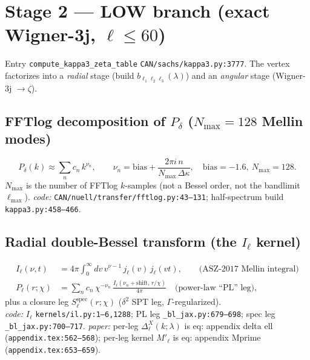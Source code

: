 \documentclass[11pt]{article}
\newcommand{\code}[1]{\texttt{\footnotesize #1}}
\newcommand{\eq}[1]{\textsf{#1}}                 %
\newcommand{\chh}{\chi}
\newcommand{\lam}{\lambda}
\begin{document}
\section{Stage 2 --- LOW branch (exact Wigner-3j, $\ell\le 60$)}
Entry \code{compute\_kappa3\_zeta\_table} \code{CAN/sachs/kappa3.py:3777}. The vertex
factorizes into a \emph{radial} stage (build $b_{\ell_1\ell_2\ell_3}(\lam)$) and an
\emph{angular} stage (Wigner-3j $\to\zeta$).

\subsection{FFTlog decomposition of $P_\delta$ ($N_{\max}=128$ Mellin modes)}
\begin{equation}
P_\delta(k)\approx\sum_n c_n\,k^{\nu_n},\qquad
\nu_n=\mathrm{bias}+\frac{2\pi i\,n}{N_{\max}\,\Delta\kappa},\quad
\mathrm{bias}=-1.6,\ N_{\max}=128 .
\end{equation}
$N_{\max}$ is the number of FFTlog $k$-samples (not a Bessel order, not the bandlimit
$\ell_{\max}$). \textit{code:} \code{CAN/nuell/transfer/fftlog.py:43--131};
half-spectrum build \code{kappa3.py:458--466}.

\subsection{Radial double-Bessel transform (the $I_\ell$ kernel)}
\begin{align}
I_\ell(\nu,t)&=4\pi\int_0^\infty dv\,v^{\nu-1}\,j_\ell(v)\,j_\ell(vt),
   \qquad\text{(ASZ-2017 Mellin integral)}\\
P_\ell(r;\chh)&=\sum_n c_n\,\chh^{-\nu_n}\,\frac{I_\ell(\nu_n+\mathrm{shift},\,r/\chh)}{4\pi}
   \quad\text{(power-law ``PL'' leg)},
\end{align}
plus a closure leg $S^{\mathrm{spec}}_\ell(r;\chh)$ ($\delta^2$ SPT leg, $\Gamma$-regularized).\\
\textit{code:} $I_\ell$ \code{kernels/il.py:1--6,1288}; PL leg \code{\_bl\_jax.py:679--698};
spec leg \code{\_bl\_jax.py:700--717}.\quad
\textit{paper:} per-leg $\Delta_\ell^X(k;\lam)$ is \eq{eq: appendix delta ell}
(\code{appendix.tex:562--568}); per-leg kernel $M'_\ell$ is \eq{eq: appendix Mprime}
(\code{appendix.tex:653--659}).
\end{document}
